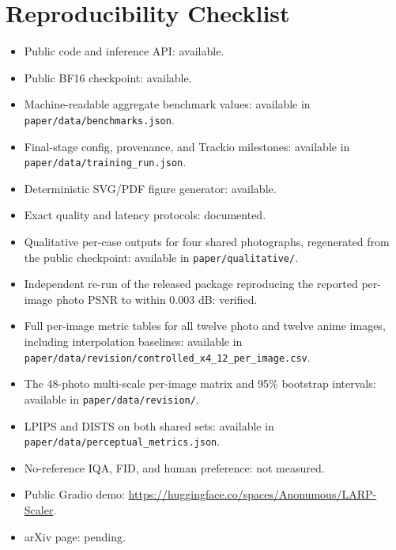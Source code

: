\documentclass[10pt]{article}
\begin{document}
\section{Reproducibility Checklist}
\label{app:checklist}

\begin{itemize}
  \item Public code and inference API: available.
  \item Public BF16 checkpoint: available.
  \item Machine-readable aggregate benchmark values: available in
  \texttt{paper/data/benchmarks.json}.
  \item Final-stage config, provenance, and Trackio milestones: available in
  \texttt{paper/data/training\_run.json}.
  \item Deterministic SVG/PDF figure generator: available.
  \item Exact quality and latency protocols: documented.
  \item Qualitative per-case outputs for four shared photographs, regenerated
  from the public checkpoint: available in \texttt{paper/qualitative/}.
  \item Independent re-run of the released package reproducing the reported
  per-image photo PSNR to within 0.003 dB: verified.
  \item Full per-image metric tables for all twelve photo and twelve anime
  images, including interpolation baselines: available in
  \texttt{paper/data/revision/controlled\_x4\_12\_per\_image.csv}.
  \item The 48-photo multi-scale per-image matrix and 95\% bootstrap intervals:
  available in \texttt{paper/data/revision/}.
  \item LPIPS and DISTS on both shared sets: available in
  \texttt{paper/data/perceptual\_metrics.json}.
  \item No-reference IQA, FID, and human preference: not measured.
  \item Public Gradio demo:
  \url{https://huggingface.co/spaces/Anonumous/LARP-Scaler}.
  \item arXiv page: pending.
\end{itemize}
\fi
\end{document}
